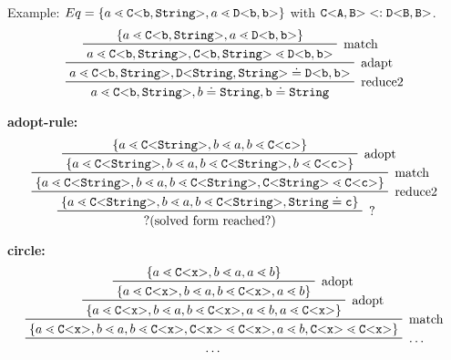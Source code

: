 Example:
$Eq = \{ a \lessdot \mathtt{C {\tt <} b,\tt{String} {\tt >} }, a \lessdot \mathtt{D {\tt <} b,b {\tt >} } \}$
with $\mathtt{C {\tt <} A,B {\tt >} } <: \mathtt{D {\tt <} B,B {\tt >} }$.
\begin{displaymath}
\prftree[r]{
    reduce2
        }{
    \prftree[r]{
        adapt
            }{
    \prftree[r]{
        match
            }{
    \set{a \lessdot \exptype{C}{b,\tt{String}}, a \lessdot \exptype{D}{b,b}}
    }{
    a \lessdot \exptype{C}{b,\tt{String}}, \exptype{C}{b,\tt{String}} \lessdot \exptype{D}{b,b}
    }
    }{
         a \lessdot \exptype{C}{b,\tt{String}}, \exptype{D}{\tt{String},\tt{String}} \doteq \exptype{D}{b,b}
    }}
    {
       a \lessdot \exptype{C}{b,\tt{String}}, b \doteq \tt{String}, b \doteq \tt{String}
        }
\end{displaymath}

\textbf{adopt-rule:}\\
\begin{displaymath}
    \prftree[r]{
        ?
    }{
\prftree[r]{
    reduce2
        }{
    \prftree[r]{
        match
            }{
    \prftree[r]{
        adopt
            }{
    \set{a \lessdot \exptype{C}{\tt{String}}, b \lessdot a, b \lessdot \exptype{C}{c}}
    }{
        \set{a \lessdot \exptype{C}{\tt{String}}, b \lessdot a, b \lessdot \exptype{C}{\tt{String}}, b \lessdot \exptype{C}{c}}
    }
    }{
        \set{a \lessdot \exptype{C}{\tt{String}}, b \lessdot a, b \lessdot \exptype{C}{\tt{String}}, \exptype{C}{\tt{String}} \lessdot \exptype{C}{c}}
    }}
    {
        \set{a \lessdot \exptype{C}{\tt{String}}, b \lessdot a, b \lessdot \exptype{C}{\tt{String}}, \tt{String} \doteq c}
    }}{
    ? \text{(solved form reached?)}
        }
\end{displaymath}


\textbf{circle:}\\
\begin{displaymath}
    \prftree[r]{
        \ldots
    }{
\prftree[r]{
    match
        }{
    \prftree[r]{
        adopt
            }{
    \prftree[r]{
        adopt
            }{
\set{a \lessdot \exptype{C}{x}, b \lessdot a, a \lessdot b}
}{
    \set{a \lessdot \exptype{C}{x}, b \lessdot a, b \lessdot \exptype{C}{x}, a \lessdot b}
}
}{
    \set{a \lessdot \exptype{C}{x}, b \lessdot a, b \lessdot \exptype{C}{x}, a \lessdot b, a \lessdot \exptype{C}{x}}
}}
{
    \set{a \lessdot \exptype{C}{x}, b \lessdot a, b \lessdot \exptype{C}{x}, \exptype{C}{x} \lessdot \exptype{C}{x}, a \lessdot b, \exptype{C}{x} \lessdot \exptype{C}{x}}
}}{
 \ldots
        }
\end{displaymath}

